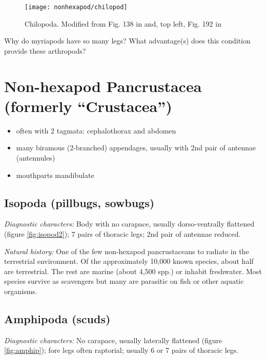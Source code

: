 \begin{figure}[ht!]
	\centering
        \texttt{[image: nonhexapod/chilopod]}
        \caption{Chilopoda. Modified from Fig. 138 in \cite{bhlitem91180chilopod} and, top left, Fig. 192 in \cite{bhlitem117775chilo2}}
        \label{fig:chilo2}
\end{figure}

\begin{theo}
{}Why do myriapods have so many legs? What advantage(s) does this condition provide these arthropods?
\end{theo}

\section{Non-hexapod Pancrustacea (formerly ``Crustacea'')}
\begin{itemize}
\item often with 2 tagmata: cephalothorax and abdomen
\item many biramous (2-branched) appendages, usually with 2nd pair of antennae (antennules)
\item mouthparts mandibulate
\end{itemize}

\subsection{Isopoda (pillbugs, sowbugs)}
\noindent{}\textit{Diagnostic characters:} Body with no carapace, usually dorso-ventrally flattened (figure \ref{fig:isopod2}); 7 pairs of thoracic legs; 2nd pair of antennae reduced.\vspace{3mm}

\noindent{}\textit{Natural history:} One of the few non-hexapod pancrustaceans to radiate in the terrestrial environment. Of the approximately 10,000 known species, about half are terrestrial. The rest are marine (about 4,500 spp.) or inhabit freshwater. Most species survive as scavengers but many are parasitic on fish or other aquatic organisms.\vspace{3mm}

\subsection{Amphipoda (scuds)}
\noindent{}\textit{Diagnostic characters:} No carapace, usually laterally flattened (figure \ref{fig:amphip}); fore legs often raptorial; usually 6 or 7 pairs of thoracic legs.\vspace{3mm}

